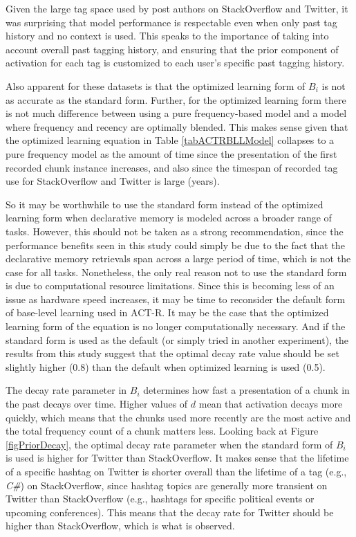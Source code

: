 \documentclass[man,floatsintext,donotrepeattitle]{apa6}
\begin{document}
Given the large tag space used by post authors on StackOverflow and Twitter, it was surprising that model performance is respectable even when only past tag history and no context is used.
This speaks to the importance of taking into account overall past tagging history, and ensuring that the prior component of activation for each tag is customized to each user's specific past tagging history.

Also apparent for these datasets is that the optimized learning form of $B_{i}$ is not as accurate as the standard form.
Further, for the optimized learning form there is not much difference between using a pure frequency-based model and a model where frequency and recency are optimally blended.
This makes sense given that the optimized learning equation in Table \ref{tabACTRBLLModel} collapses to a pure frequency model as the amount of time since the presentation of the first recorded chunk instance increases,
and also since the timespan of recorded tag use for StackOverflow and Twitter is large (years).

So it may be worthwhile to use the standard form instead of the optimized learning form when declarative memory is modeled across a broader range of tasks.
However, this should not be taken as a strong recommendation,
since the performance benefits seen in this study could simply be due to the fact that the declarative memory retrievals span across a large period of time, which is not the case for all tasks.
Nonetheless, the only real reason not to use the standard form is due to computational resource limitations.
Since this is becoming less of an issue as hardware speed increases, it may be time to reconsider the default form of base-level learning used in ACT-R.
It may be the case that the optimized learning form of the equation is no longer computationally necessary.
And if the standard form is used as the default (or simply tried in another experiment),
the results from this study suggest that the optimal decay rate value should be set slightly higher (\num{0.8}) than the default when optimized learning is used (\num{0.5}).

The decay rate parameter in $B_{i}$ determines how fast a presentation of a chunk in the past decays over time.
Higher values of $d$ mean that activation decays more quickly, which means that the chunks used more recently are the most active and the total frequency count of a chunk matters less.
Looking back at Figure \ref{figPriorDecay}, the optimal decay rate parameter when the standard form of $B_{i}$ is used is higher for Twitter than StackOverflow.
It makes sense that the lifetime of a specific hashtag on Twitter is shorter overall than the lifetime of a tag (e.g., \emph{C\#}) on StackOverflow,
since hashtag topics are generally more transient on Twitter than StackOverflow (e.g., hashtags for specific political events or upcoming conferences).
This means that the decay rate for Twitter should be higher than StackOverflow, which is what is observed.
\end{document}
